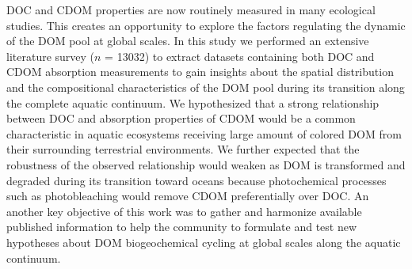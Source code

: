 DOC and CDOM properties are now routinely measured in many ecological studies. This creates an opportunity to explore the factors regulating the dynamic of the DOM pool at global scales. In this study we performed an extensive literature survey ($n$ = 13032) to extract datasets containing both DOC and CDOM absorption measurements to gain insights about the spatial distribution and the compositional characteristics of the DOM pool during its transition along the complete aquatic continuum. We hypothesized that a strong relationship between DOC and absorption properties of CDOM would be a common characteristic in aquatic ecosystems receiving large amount of colored DOM from their surrounding terrestrial environments. We further expected that the robustness of the observed relationship would weaken as DOM is transformed and degraded during its transition toward oceans because photochemical processes such as photobleaching would remove CDOM preferentially over DOC. An another key objective of this work was to gather and harmonize available published information to help the community to formulate and test new hypotheses about DOM biogeochemical cycling at global scales along the aquatic continuum.

